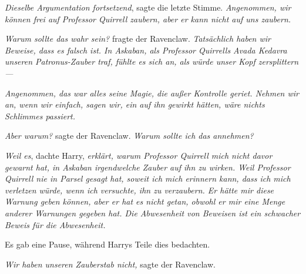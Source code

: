\emph{Dieselbe Argumentation fortsetzend}, sagte die letzte Stimme. \emph{Angenommen, wir können frei auf Professor Quirrell zaubern, aber er kann nicht auf uns zaubern.}

\emph{Warum sollte das wahr sein?} fragte der Ravenclaw. \emph{Tatsächlich haben wir Beweise, dass es falsch ist. In Askaban, als Professor Quirrells Avada Kedavra unseren Patronus-Zauber traf, fühlte es sich an, als würde unser Kopf zersplittern —}

\emph{Angenommen, das war alles \emph{seine} Magie, die außer Kontrolle geriet. Nehmen wir an, wenn wir einfach, sagen wir, ein  auf ihn gewirkt hätten, wäre nichts Schlimmes passiert.}

\emph{Aber warum?} sagte der Ravenclaw. \emph{Warum sollte ich das annehmen?}

\emph{Weil es}, dachte Harry, \emph{erklärt, warum Professor Quirrell mich nicht davor gewarnt hat, in Askaban irgendwelche Zauber auf ihn zu wirken. Weil Professor Quirrell nie in Parsel gesagt hat, soweit ich mich erinnern kann, dass ich mich verletzen würde, wenn ich versuchte, ihn zu verzaubern. Er hätte mir diese Warnung geben können, aber er hat es nicht getan, obwohl er mir eine Menge anderer Warnungen gegeben hat. Die Abwesenheit von Beweisen ist ein schwacher Beweis für die Abwesenheit.}

Es gab eine Pause, während Harrys Teile dies bedachten.

\emph{Wir haben unseren Zauberstab nicht,} sagte der Ravenclaw.

